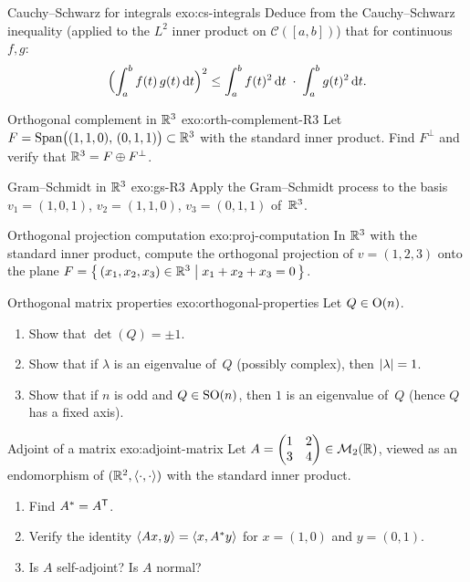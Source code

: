 \begin{exercise}{Cauchy--Schwarz for integrals \basic}{exo:cs-integrals}
Deduce from the Cauchy--Schwarz inequality (applied to the $L^2$ inner
product on $\mathcal{C}([a,b])$) that for continuous $f,g$:
\[
  \Bigl(\int_a^b f(t)\,g(t)\,\mathrm{d}t\Bigr)^2
    \leq \int_a^b f(t)^2\,\mathrm{d}t\;\cdot\;
         \int_a^b g(t)^2\,\mathrm{d}t.
\]
\end{exercise}

\begin{exercise}{Orthogonal complement in ${\mathbb{R}}^3$ \basic}%
{exo:orth-complement-R3}
Let $F = \operatorname{Span}\bigl((1,1,0),\,(0,1,1)\bigr)\subset{\mathbb{R}}^3$ with the
standard inner product.  Find $F^{\perp}$ and verify that
${\mathbb{R}}^3 = F\oplus F^{\perp}$.
\end{exercise}

\begin{exercise}{Gram--Schmidt in ${\mathbb{R}}^3$ \basic}{exo:gs-R3}
Apply the Gram--Schmidt process to the basis
$v_1 = (1,0,1)$, $v_2 = (1,1,0)$, $v_3 = (0,1,1)$ of~${\mathbb{R}}^3$.
\end{exercise}

\begin{exercise}{Orthogonal projection computation \basic}%
{exo:proj-computation}
In ${\mathbb{R}}^3$ with the standard inner product, compute the orthogonal
projection of $v = (1,2,3)$ onto the plane
$F = \left\{\,(x_1,x_2,x_3)\in{\mathbb{R}}^3\;\middle|\;x_1 + x_2 + x_3 = 0\,\right\}$.
\end{exercise}

\begin{exercise}{Orthogonal matrix properties \intermediate}%
{exo:orthogonal-properties}
Let $Q\in\operatorname{O}(n)$.
\begin{enumerate}[label=(\alph*)]
  \item Show that $\det(Q) = \pm 1$.
  \item Show that if $\lambda$ is an eigenvalue of~$Q$ (possibly
    complex), then $\lvert\lambda\rvert = 1$.
  \item Show that if $n$ is odd and $Q\in\operatorname{SO}(n)$, then $1$ is an
    eigenvalue of~$Q$ (hence $Q$ has a fixed axis).
\end{enumerate}
\end{exercise}

\begin{exercise}{Adjoint of a matrix \intermediate}{exo:adjoint-matrix}
Let $A = \begin{pmatrix} 1 & 2 \\ 3 & 4 \end{pmatrix}\in\mathcal{M}_2({\mathbb{R}})$,
viewed as an endomorphism of $({\mathbb{R}}^2,\langle\cdot,\cdot\rangle)$ with the
standard inner product.
\begin{enumerate}[label=(\alph*)]
  \item Find $A^* = {A}^{\mathsf{T}}$.
  \item Verify the identity $\langle Ax,y\rangle = \langle x,A^* y\rangle$ for
    $x = (1,0)$ and $y = (0,1)$.
  \item Is $A$ self-adjoint?  Is $A$ normal?
\end{enumerate}
\end{exercise}

